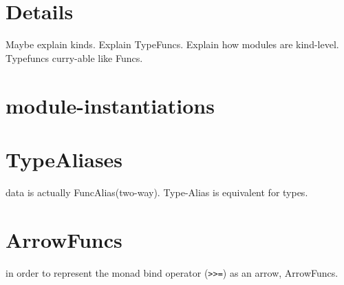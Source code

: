 \section{Details}
\begin{multicols}{2}
\columnbreak
Maybe explain kinds.
Explain TypeFuncs.
Explain how modules are kind-level.
Typefuncs curry-able like Funcs.
\end{multicols}

\section{module-instantiations}
\section{TypeAliases}
data is actually FuncAlias(two-way). Type-Alias is equivalent for types.

\section{ArrowFuncs}
in order to represent the monad bind operator (\texttt{>>=}) as an arrow, ArrowFuncs.
